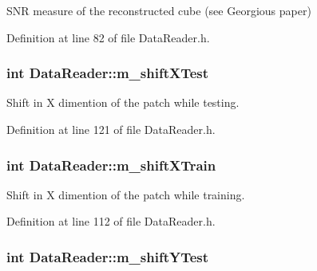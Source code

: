 S\+NR measure of the reconstructed cube (see Georgious paper) 



Definition at line 82 of file Data\+Reader.\+h.

\subsubsection[{\texorpdfstring{m\+\_\+shift\+X\+Test}{m_shiftXTest}}]{\setlength{\rightskip}{0pt plus 5cm}int Data\+Reader\+::m\+\_\+shift\+X\+Test\hspace{0.3cm}{\ttfamily [private]}}\hypertarget{classDataReader_a066a1c0f512fccdb2b21d23cce551ee7}{}\label{classDataReader_a066a1c0f512fccdb2b21d23cce551ee7}


Shift in X dimention of the patch while testing. 



Definition at line 121 of file Data\+Reader.\+h.

\subsubsection[{\texorpdfstring{m\+\_\+shift\+X\+Train}{m_shiftXTrain}}]{\setlength{\rightskip}{0pt plus 5cm}int Data\+Reader\+::m\+\_\+shift\+X\+Train\hspace{0.3cm}{\ttfamily [private]}}\hypertarget{classDataReader_a6d2cc22f742392bafb485fe0f07b13e8}{}\label{classDataReader_a6d2cc22f742392bafb485fe0f07b13e8}


Shift in X dimention of the patch while training. 



Definition at line 112 of file Data\+Reader.\+h.

\subsubsection[{\texorpdfstring{m\+\_\+shift\+Y\+Test}{m_shiftYTest}}]{\setlength{\rightskip}{0pt plus 5cm}int Data\+Reader\+::m\+\_\+shift\+Y\+Test\hspace{0.3cm}{\ttfamily [private]}}\hypertarget{classDataReader_ab5002c766c4cebca361dd21f1d2cbc86}{}\label{classDataReader_ab5002c766c4cebca361dd21f1d2cbc86}


